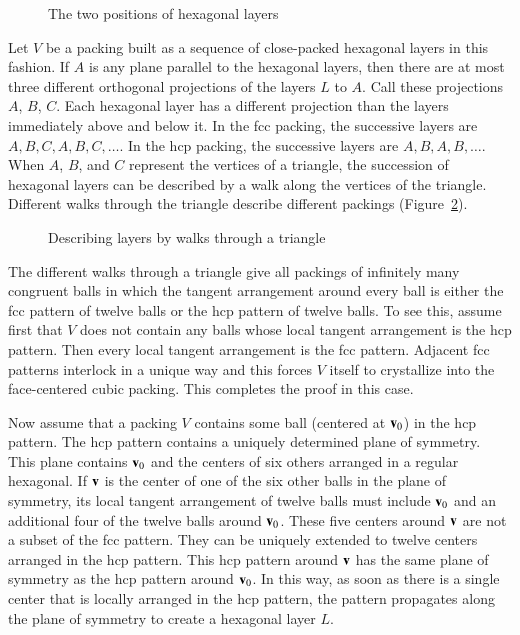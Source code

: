 \begin{figure}[htb]
  \centering
  \caption{The two positions of hexagonal layers}
  \label{fig:two-holes}
\end{figure}

Let $V$ be a packing built as a sequence of close-packed hexagonal
layers in this fashion.  If $A$ is any plane parallel to the hexagonal
layers, then there are at most three different orthogonal projections
of the layers $L$ to $A$.  Call these projections $A$, $B$, $C$.  Each
hexagonal layer has a different projection than the layers immediately
above and below it.  In the fcc packing, the successive layers are
$A,B,C,A,B,C,\ldots$.  In the hcp packing, the successive layers are
$A,B,A,B,\ldots$.  When $A$, $B$, and $C$ represent the vertices of a
triangle, the succession of hexagonal layers can be described by a
walk along the vertices of the triangle. Different walks through the
triangle describe different packings (Figure~\ref{fig:fcc-tri}).

\begin{figure}[htb]
  \centering
  \caption{Describing layers by walks through a triangle}
  \label{fig:fcc-tri}
\end{figure}

The different walks through a triangle give all packings of infinitely
many congruent balls in which the tangent arrangement around every ball is
either the fcc pattern of twelve balls or the hcp pattern of twelve
balls.  To see
this, assume first that $V$ does not contain any balls whose local
tangent arrangement is the hcp pattern.  Then every local tangent
arrangement is the fcc pattern.  Adjacent fcc patterns interlock in a unique way
and this forces $V$ itself to crystallize into the
face-centered cubic packing.  This completes the proof in this case.

Now assume that a packing $V$ contains some ball (centered at ${\mathbf v}_0$)
in the hcp pattern. The hcp pattern contains a uniquely determined
plane of symmetry. This plane contains ${\mathbf v}_0$ and the centers of six
others arranged in a regular hexagonal. If ${\mathbf v}$ is the center of one of
the six other balls in the plane of symmetry, its local tangent arrangement
of twelve balls must include ${\mathbf v}_0$ and an additional four of the
twelve balls around ${\mathbf v}_0$. These five centers around ${\mathbf v}$ are not a
subset of the fcc pattern. They can be uniquely extended to twelve
centers arranged in the hcp pattern. This hcp pattern around ${\mathbf v}$ has the same
plane of symmetry as the hcp pattern around ${\mathbf v}_0$. In this way, as
soon as there is a single center that is locally arranged in the hcp pattern, the pattern
propagates along the plane of symmetry to create a hexagonal layer
$L$.

